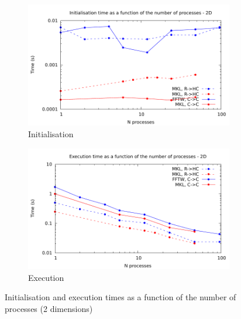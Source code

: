 \documentclass[12pt, a4paper]{article} \setlength{\textheight}{24cm}
\begin{document}
\begin{figure}[H]
  \captionsetup{width=0.8\linewidth}
  \centering
  \begin{subfigure}{.5\textwidth}
    \centering
    \includegraphics[width=.9\linewidth]{graphs/mpi-init-2d.pdf}
    \caption{Initialisation}
    \label{2DMPII}
  \end{subfigure}%
  \begin{subfigure}{.5\textwidth}
    \centering
    \includegraphics[width=.9\linewidth]{graphs/mpi-exec-2d.pdf}
    \caption{Execution}
    \label{2DMPIE}
  \end{subfigure}
  \caption{Initialisation and execution times as a function of the
    number of processes (2 dimensions)}
  \label{2DMPI}
\end{figure}
\end{document}
